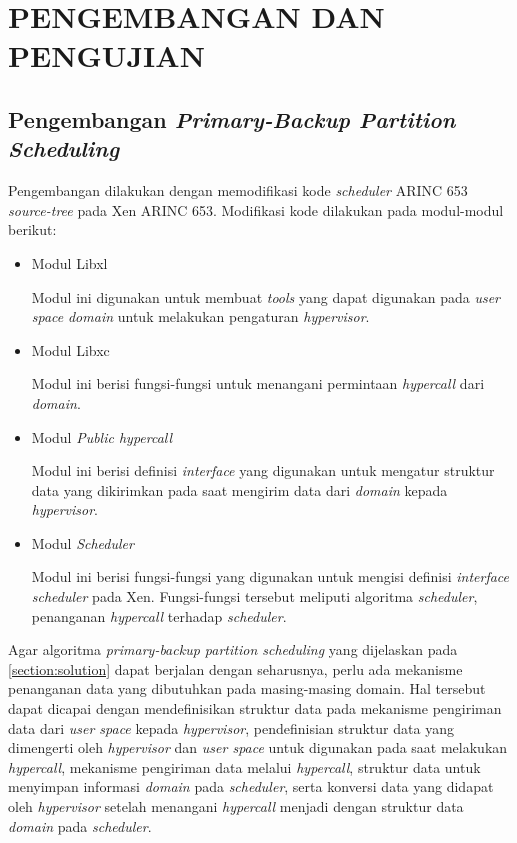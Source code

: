 \chapter{PENGEMBANGAN DAN PENGUJIAN}

\section{Pengembangan \textit{Primary-Backup Partition Scheduling}}

Pengembangan dilakukan dengan memodifikasi kode \textit{scheduler} ARINC 653
\textit{source-tree} pada Xen ARINC 653.  Modifikasi kode dilakukan pada modul-modul berikut:

\begin{itemize}

	\item Modul Libxl

	Modul ini digunakan untuk membuat \textit{tools} yang dapat digunakan pada \textit{user
	space} \textit{domain}  untuk melakukan pengaturan \textit{hypervisor}.

	\item Modul Libxc

	Modul ini berisi fungsi-fungsi untuk menangani permintaan \textit{hypercall} dari
	\textit{domain}.

	\item Modul \textit{Public hypercall}

	Modul ini berisi definisi \textit{interface} yang digunakan untuk mengatur struktur data
	yang dikirimkan pada saat mengirim data dari \textit{domain} kepada \textit{hypervisor}.

	\item Modul \textit{Scheduler}

	Modul ini berisi fungsi-fungsi yang digunakan untuk mengisi definisi \textit{interface}
	\textit{scheduler} pada Xen. Fungsi-fungsi tersebut meliputi algoritma
	\textit{scheduler}, penanganan \textit{hypercall} terhadap \textit{scheduler}.

\end{itemize}

Agar algoritma \textit{primary-backup partition scheduling} yang dijelaskan pada
\autoref{section:solution} dapat berjalan dengan seharusnya, perlu ada mekanisme penanganan data
yang dibutuhkan pada masing-masing domain. Hal tersebut dapat dicapai dengan mendefinisikan
struktur data pada mekanisme pengiriman data dari \textit{user space} kepada
\textit{hypervisor}, pendefinisian struktur data yang dimengerti oleh \textit{hypervisor} dan
\textit{user space} untuk digunakan pada saat melakukan \textit{hypercall}, mekanisme pengiriman
data melalui \textit{hypercall}, struktur data untuk menyimpan informasi \textit{domain} pada
\textit{scheduler}, serta konversi data yang didapat oleh \textit{hypervisor} setelah menangani
\textit{hypercall} menjadi dengan struktur data \textit{domain} pada \textit{scheduler}.

